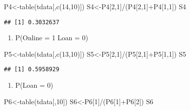 \documentclass[
]{article}
\newenvironment{Shaded}{\begin{snugshade}}{\end{snugshade}}
\newcommand{\DecValTok}[1]{\textcolor[rgb]{0.00,0.00,0.81}{#1}}
\newcommand{\FunctionTok}[1]{\textcolor[rgb]{0.00,0.00,0.00}{#1}}
\newcommand{\NormalTok}[1]{#1}
\newcommand{\OtherTok}[1]{\textcolor[rgb]{0.56,0.35,0.01}{#1}}
\newcommand{\SpecialCharTok}[1]{\textcolor[rgb]{0.00,0.00,0.00}{#1}}
\providecommand{\tightlist}{%
  \setlength{\itemsep}{0pt}\setlength{\parskip}{0pt}}
\begin{document}
\begin{Shaded}
\begin{Highlighting}[]
\NormalTok{P4}\OtherTok{\textless{}{-}}\FunctionTok{table}\NormalTok{(tdata[,}\FunctionTok{c}\NormalTok{(}\DecValTok{14}\NormalTok{,}\DecValTok{10}\NormalTok{)])}
\NormalTok{S4}\OtherTok{\textless{}{-}}\NormalTok{P4[}\DecValTok{2}\NormalTok{,}\DecValTok{1}\NormalTok{]}\SpecialCharTok{/}\NormalTok{(P4[}\DecValTok{2}\NormalTok{,}\DecValTok{1}\NormalTok{]}\SpecialCharTok{+}\NormalTok{P4[}\DecValTok{1}\NormalTok{,}\DecValTok{1}\NormalTok{])}
\NormalTok{S4}
\end{Highlighting}
\end{Shaded}

\begin{verbatim}
## [1] 0.3032637
\end{verbatim}

\begin{enumerate}
\def\labelenumi{\alph{enumi}.}
\setcounter{enumi}{21}
\tightlist
\item
  P(Online = 1 \textbar{} Loan = 0)
\end{enumerate}

\begin{Shaded}
\begin{Highlighting}[]
\NormalTok{P5}\OtherTok{\textless{}{-}}\FunctionTok{table}\NormalTok{(tdata[,}\FunctionTok{c}\NormalTok{(}\DecValTok{13}\NormalTok{,}\DecValTok{10}\NormalTok{)])}
\NormalTok{S5}\OtherTok{\textless{}{-}}\NormalTok{P5[}\DecValTok{2}\NormalTok{,}\DecValTok{1}\NormalTok{]}\SpecialCharTok{/}\NormalTok{(P5[}\DecValTok{2}\NormalTok{,}\DecValTok{1}\NormalTok{]}\SpecialCharTok{+}\NormalTok{P5[}\DecValTok{1}\NormalTok{,}\DecValTok{1}\NormalTok{])}
\NormalTok{S5}
\end{Highlighting}
\end{Shaded}

\begin{verbatim}
## [1] 0.5958929
\end{verbatim}

\begin{enumerate}
\def\labelenumi{\roman{enumi}.}
\setcounter{enumi}{5}
\tightlist
\item
  P(Loan = 0)
\end{enumerate}

\begin{Shaded}
\begin{Highlighting}[]
\NormalTok{P6}\OtherTok{\textless{}{-}}\FunctionTok{table}\NormalTok{(tdata[,}\DecValTok{10}\NormalTok{])}
\NormalTok{S6}\OtherTok{\textless{}{-}}\NormalTok{P6[}\DecValTok{1}\NormalTok{]}\SpecialCharTok{/}\NormalTok{(P6[}\DecValTok{1}\NormalTok{]}\SpecialCharTok{+}\NormalTok{P6[}\DecValTok{2}\NormalTok{])}
\NormalTok{S6}
\end{Highlighting}
\end{Shaded}
\end{document}
